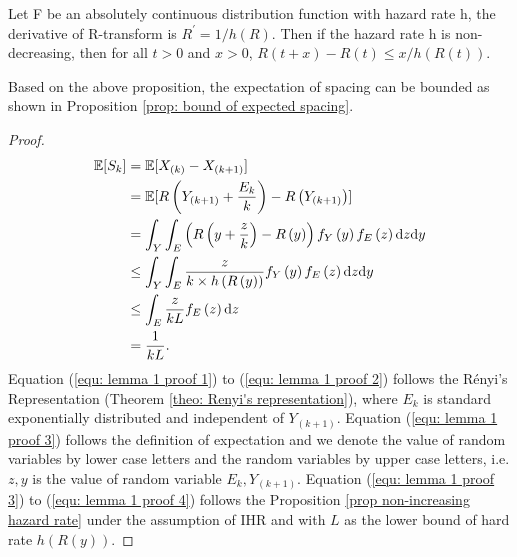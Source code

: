\begin{prop} 
\label{prop non-increasing hazard rate}
Let F be an absolutely continuous distribution function with hazard
rate h, the derivative of R-transform is $ R^{\prime}=1 / h\left(R\right)$. Then if the hazard rate h is non-decreasing, then for all $t > 0$ and $x > 0$, $R\left(t+x\right)-R(t) \leq x / h\left(R(t)\right).$
\end{prop}
Based on the above proposition, the expectation of spacing can be bounded as shown in Proposition \ref{prop: bound of expected spacing}.

\BoundExpSpacing*
\begin{proof}
\begin{align}
    \label{equ: lemma 1 proof 1}
    \mathbb{E}[S_k]
    &= \mathbb{E}[X_{(k)} - X_{(k + 1)}]\\
    \label{equ: lemma 1 proof 2}
    &= \mathbb{E}[R\left(Y_{\left(k+1\right)} + \frac{E_k}{k}\right) - R\left(Y_{\left(k+1\right)}\right)]\\
    \label{equ: lemma 1 proof 3}
    &= \int_{Y} \int_{E} \left(R\left(y + \frac{z}{k}\right) - R\left(y\right)\right) f_Y\left(y\right) f_E\left(z\right) \mathrm{d} z \mathrm{d} y \\
    & \leq \int_{Y} \int_{E} \frac{z}{k \times h\left(R\left(y\right)\right)} f_Y\left(y\right) f_E\left(z\right) \mathrm{d} z \mathrm{d} y \\
    \label{equ: lemma 1 proof 4}
    & \leq \int_{E} \frac{z}{kL} f_E\left(z\right) \mathrm{d} z\\
    &= \frac{1}{kL}.
\end{align}
Equation (\ref{equ: lemma 1 proof 1}) to (\ref{equ: lemma 1 proof 2}) follows the R\'enyi's Representation (Theorem \ref{theo: Renyi's representation}), where $E_{k}$ is standard exponentially distributed and independent of $Y_{\left(k + 1\right)}$.
Equation (\ref{equ: lemma 1 proof 3}) follows the definition of expectation and we denote the value of random variables by lower case letters and the random variables by upper case letters, i.e. $z, y$ is the value of random variable $E_{k}, Y_{(k+1)}$.  
Equation (\ref{equ: lemma 1 proof 3}) to (\ref{equ: lemma 1 proof 4}) follows the Proposition \ref{prop non-increasing hazard rate} under the assumption of IHR and with $L$ as the lower bound of hard rate $h\left(R\left(y\right)\right)$.
\end{proof}


